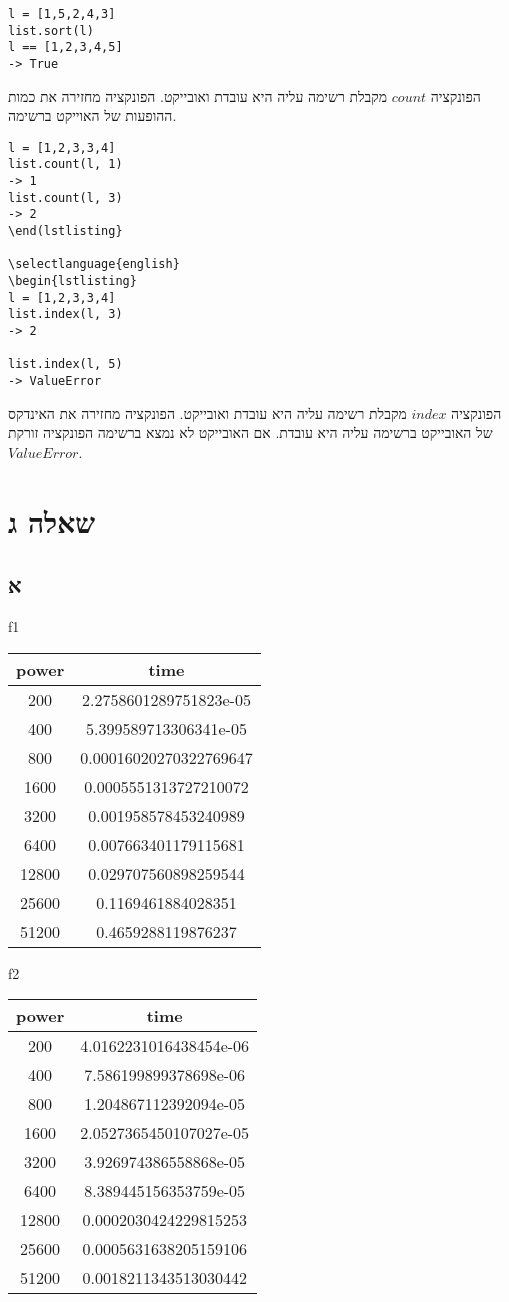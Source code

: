 \documentclass[12pt]{report}
\begin{document}
\begin{lstlisting}
l = [1,5,2,4,3]
list.sort(l)
l == [1,2,3,4,5]
-> True
\end{lstlisting}

הפונקציה $count$ מקבלת רשימה עליה היא עובדת ואובייקט. הפונקציה מחזירה את כמות ההופעות של האוייקט ברשימה.
\begin{lstlisting}
l = [1,2,3,3,4]
list.count(l, 1)
-> 1
list.count(l, 3)
-> 2
\end(lstlisting}

\selectlanguage{english}
\begin{lstlisting}
l = [1,2,3,3,4]
list.index(l, 3)
-> 2

list.index(l, 5)
-> ValueError
\end{lstlisting}

הפונקציה $index$ מקבלת רשימה עליה היא עובדת ואובייקט. הפונקציה מחזירה את האינדקס של האובייקט ברשימה עליה היא עובדת. אם האובייקט לא נמצא ברשימה הפונקציה זורקת $ValueError$.
\section*{שאלה ג}

\subsection*{א}
f1
\begin{tabular}{| c | c |}
\hline
power & time \\
\hline
200 & 2.2758601289751823e-05 \\
\hline
400 & 5.399589713306341e-05 \\
\hline
800 & 0.00016020270322769647 \\
\hline
1600 & 0.0005551313727210072 \\
\hline
3200 & 0.001958578453240989 \\
\hline
6400 & 0.007663401179115681 \\
\hline
12800 & 0.029707560898259544 \\
\hline
25600 & 0.1169461884028351 \\
\hline
51200 & 0.4659288119876237 \\
\hline
\end{tabular}
f2
\begin{tabular}{| c | c |}
\hline
power & time \\
\hline
200 & 4.0162231016438454e-06 \\
\hline
400 & 7.586199899378698e-06 \\
\hline
800 & 1.204867112392094e-05 \\
\hline
1600 & 2.0527365450107027e-05 \\
\hline
3200 & 3.926974386558868e-05 \\
\hline
6400 & 8.389445156353759e-05 \\
\hline
12800 & 0.0002030424229815253 \\
\hline
25600 & 0.0005631638205159106 \\
\hline
51200 & 0.0018211343513030442 \\
\hline
\end{tabular}
\\
\end{document}
